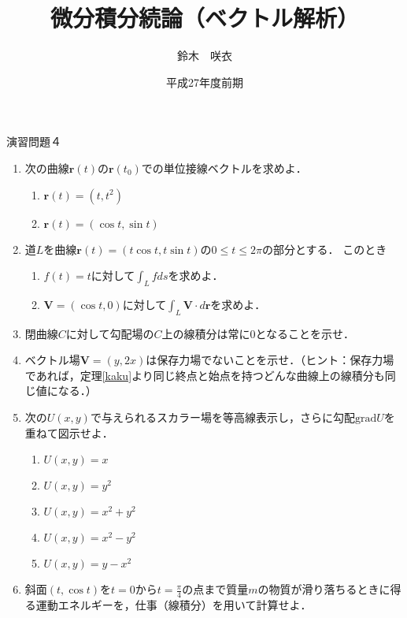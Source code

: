 \documentclass{jarticle}
\begin{document}
\title{微分積分続論（ベクトル解析）} 
\author{鈴木　咲衣}
\date{平成27年度前期}
\maketitle

\begin{center} {\Large 演習問題４ } \end{center}

\begin{enumerate}
\item \cite[問題2.42]{koba}  次の曲線$\bm r(t)$の$\bm r (t_{0})$での単位接線ベクトルを求めよ．
\begin{enumerate}
\item $\bm r(t)=(t,t^{2})$
\item $\bm r(t)=(\cos t, \sin t)$
\end{enumerate}
\item \cite[章末問題3.5]{koba} 道$L$を曲線$\bm r (t)=(t\cos t, t \sin t)$の$0\leq t\leq 2\pi$の部分とする．
このとき
\begin{enumerate}
\item $f(t)=t$に対して$\int_{L}f ds$を求めよ．
\item $\bm V=(\cos t, 0)$に対して$\int _{L}\bm V \cdot d \bm r$を求めよ．
\end{enumerate}

\item 閉曲線$C$に対して勾配場の$C$上の線積分は常に$0$となることを示せ．

\item \cite[問題6.34]{koba} ベクトル場$\bm V=(y,2x)$は保存力場でないことを示せ．（ヒント：保存力場であれば，定理\ref{kaku}より同じ終点と始点を持つどんな曲線上の線積分も同じ値になる．）


\item \cite[問題6.5]{koba} 次の$U(x,y)$で与えられるスカラー場を等高線表示し，さらに勾配$\mathrm{grad} U$を重ねて図示せよ．
\begin{enumerate}
\item $U(x,y)=x$
\item $U(x,y)=y^{2}$
\item $U(x,y)=x^{2}+y^{2}$
\item $U(x,y)=x^{2}-y^{2}$
\item $U(x,y)=y-x^{2}$
\end{enumerate}
\item \cite[問題3.14]{koba}斜面$(t,\cos t)$を$t=0$から$t=\frac{\pi}{4}$の点まで質量$m$の物質が滑り落ちるときに得る運動エネルギーを，仕事（線積分）を用いて計算せよ．
\end{enumerate}
\end{document}
